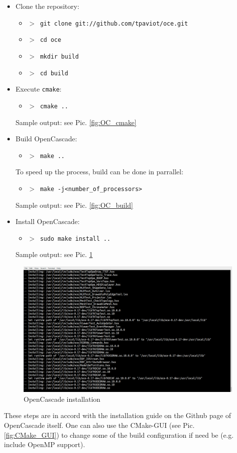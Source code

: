 \documentclass[
12pt, %
a4paper, %
oneside, %
headinclude,footinclude, %
BCOR5mm, %
]{scrartcl}
\begin{document}
\begin{itemize}
\item Clone the repository:
\begin{itemize}
\item[] \texttt{\textbf{$>$ }git clone git://github.com/tpaviot/oce.git}
\item[] \texttt{\textbf{$>$ }cd oce}
\item[] \texttt{\textbf{$>$ }mkdir build}
\item[] \texttt{\textbf{$>$ }cd build}
\end{itemize}
\item Execute \texttt{cmake}:
\begin{itemize}
\item[] \texttt{\textbf{$>$ }cmake ..}
\end{itemize}
Sample output: see Pic. \ref{fig:OC_cmake}
\item Build OpenCascade:
\begin{itemize}
\item[] \texttt{\textbf{$>$ }make ..}
\end{itemize}
To speed up the process, build can be done in parrallel:
\begin{itemize}
\item[] \texttt{\textbf{$>$ }make -j<number\_of\_processors>}
\end{itemize}
Sample output: see Pic. \ref{fig:OC_build}
\item Install OpenCascade:
\begin{itemize}
\item[] \texttt{\textbf{$>$ }sudo make install ..}
\end{itemize}
Sample output: see Pic. \ref{fig:OC_install}
\end{itemize}

\begin{figure}
\centering
\includegraphics[scale=0.3]{img/OC_Install2.png}
\caption{OpenCascade installation}
\label{fig:OC_install}
\end{figure}
	 These steps are in accord with the installation guide on the Github page of OpenCascade itself. One can also use the CMake-GUI (see Pic. \ref{fig:CMake_GUI}) to change some of the build configuration if need be (e.g. include OpenMP support).
	
\end{document}
